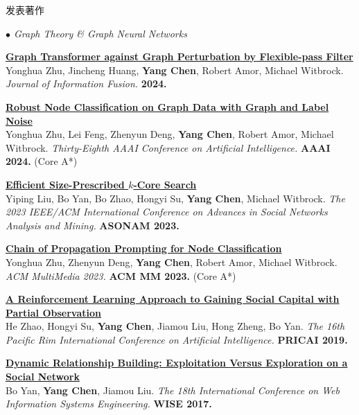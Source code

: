 \documentclass{resume} %
\begin{document}
\begin{rSection}{发表著作}
\begin{rSubsection}{\large\em $\bullet$ Graph Theory \& Graph Neural Networks}{}{}{}
	\item {\href{https://www.sciencedirect.com/science/article/pii/S1566253524000745}{\bf Graph Transformer against Graph Perturbation by Flexible-pass Filter}}\\
		Yonghua Zhu, Jincheng Huang, \textbf{Yang Chen}, Robert Amor, Michael Witbrock. {\em Journal of Information Fusion.} {\bf 2024.}\\
	\item {\href{https://ojs.aaai.org/index.php/AAAI/article/view/29668}{\bf Robust Node Classification on Graph Data with Graph and Label Noise}}\\
		Yonghua Zhu, Lei Feng, Zhenyun Deng, \textbf{Yang Chen}, Robert Amor, Michael Witbrock. {\em Thirty-Eighth AAAI Conference on Artificial Intelligence.} \textbf{AAAI 2024.} (Core A*)\\
	\item {\href{https://arxiv.org/abs/2403.09214}{\bf Efficient Size-Prescribed $k$-Core Search}}\\
		Yiping Liu, Bo Yan, Bo Zhao, Hongyi Su, \textbf{Yang Chen}, Michael Witbrock. {\em The 2023 IEEE/ACM International Conference on Advances in Social Networks Analysis and Mining.} \textbf{ASONAM 2023.}\\
	\item{
	\href{https://dl.acm.org/doi/10.1145/3581783.3612431}{\bf Chain of Propagation Prompting for Node Classification}}\\
	Yonghua Zhu, Zhenyun Deng, \textbf{Yang Chen}, Robert Amor, Michael Witbrock. {\em ACM MultiMedia 2023.} \textbf{ACM MM 2023.} (Core A*)\\
	\item {\href{https://link.springer.com/chapter/10.1007/978-3-030-29908-8_9}{\bf A Reinforcement Learning Approach to Gaining Social Capital with Partial Observation}}\\
		He Zhao, Hongyi Su, \textbf{Yang Chen}, Jiamou Liu, Hong Zheng, Bo Yan. {\em The 16th Pacific Rim International Conference on Artificial Intelligence.} \textbf{PRICAI 2019.} \\
	\item {\href{https://github.com/PolynomialTime/WISE2017/blob/master/WISE2017.pdf}{\bf Dynamic Relationship Building: Exploitation Versus Exploration on a Social Network}}\\
		Bo Yan, \textbf{Yang Chen}, Jiamou Liu. {\em The 18th International Conference on Web Information Systems Engineering.} \textbf{WISE 2017.}\\

\end{rSubsection}
\end{rSection}
\end{document}
